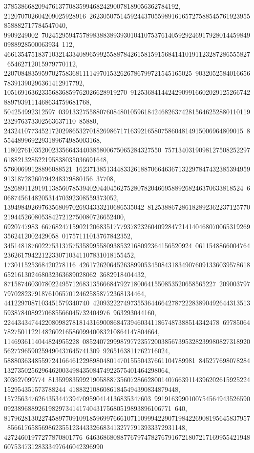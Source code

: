 {{{378538668209476137708359946824290078189056362784192, 212070702604209025928916\
26230507514592443705598916165727588545761923955858882717784547040, 9909249002\
70245295947578983883893930104107537614059292469179280144598490988928500063934\
112, 466135475183710321433408965992558878426158159156841410191123287286555827\
65462712015979770112, 2207084835959702758368111149701532626786799721545165025\
903205258401665678391390296361412917792, 105169163623356836859762026628919270\
912536841442429099166020291252667428897939111468634759681768, 504254992312597\
03913327558807608480105961842468263742815646252880110119232976373302563637110\
85880, 2432410773452172029865327018269867171639216580758604814915006964809015\
85544899692293189674985003168, 1180276103520023356643440385800675065284327550\
7571340319098127508252297618821328522195838035036691648, 57600699128896088521\
16237138513448332618870664636713229784743238539495991318728260794248379880156\
37708, 2826891129191138560785394020440456275280782046695889268246370633818524\
6068745614820531470392308559373052, 13949849269763568097026934333210686535042\
81253886728618289236223712577021944526080538427212750080726652400, 6920747983\
66768247159021206835177793782326040928472141404680700653192693562412002429058\
01757111013767842352, 3451481876022753137575358995580938532168092364156520924\
061154886600476423626179422122330710341107831018155452, 173011525368420278116\
42617262064526389905345084318349076091336039578618652161302468032363689028062\
3682918404432, 87158746030780224957126831356668479271800641550853520658565227\
20900379779702823791876106570124625858772368134464, 4412297087103451579340740\
42093222749735536446642787222838904926443135135938784089270685566045732404976\
963293044160, 224434347442208098278181431690086847394603411867487388514342478\
69785064782750112214826021658609940083210864147804664, 1146936114044824955228\
08524072999879772357200385673953282399808273189205627796590259490437645741309\
9265163811762716024, 58880363485597241664612298980480147015550437661104789981\
845277698078284132735025629646200349843508474922575401464298064, 303627099774\
81359983599219058887356072866280014076639114396202615925224152954351573788244\
41883210860861845494390834879448, 1572563476264353447394709590414136835347603\
99191639901007545649435265900923896889261982973414174043175680519893896106771\
640, 817962813022745897709109185969976661071109994229071984226908195645837957\
8566176585698623551234433266834132777913933372931148, 42724601977277870801776\
64636868088776797478276791672180721716995542194860753473128333497646042396990\
}}}
